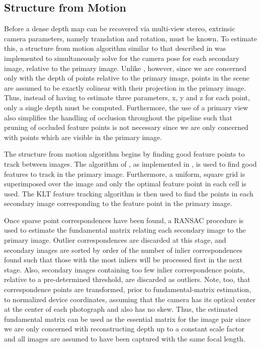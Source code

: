 \documentclass[conference]{acmsiggraph}
\begin{document}
\subsection{Structure from Motion}

Before a dense depth map can be recovered via multi-view stereo,
extrinsic camera parameters, namely translation and rotation, must be known.
To estimate this, a structure from motion algorithm similar to that
described in \cite{snavely2006photo} was implemented to
simultaneously solve for the camera pose for each secondary image,
relative to the primary image.
Unlike \cite{snavely2006photo}, however, since we are concerned
only with the depth of points relative to the primary image,
points in the scene are assumed to be exactly colinear with
their projection in the primary image.  Thus, instead of having
to estimate three parameters, x, y and z for each point,
only a single depth must be computed.  Furthermore, the use
of a primary view also simplifies the handling of occlusion throughout
the pipeline such that pruning of occluded feature points
is not necessary since we are only concerned with points which
are visible in the primary image.

The structure from motion algorithm begins by finding good feature points
to track between images.  The algorithm of \cite{shi1994good}, as implemented
in \cite{opencv_library}, is used to find good features to track in the
primary image.
Furthermore, a uniform, square grid is superimposed over the image and only
the optimal feature point in each cell is used.
The KLT feature tracking algorithm is then used to find the points in each
secondary image corresponding to the feature point in the primary image.

Once sparse point correspondences have been found, a RANSAC procedure
is used to estimate the fundamental matrix relating each secondary
image to the primary image.  Outlier correspondences are discarded at this
stage, and secondary images are sorted by order of the number of inlier
correspondences found such that those with the most inliers will
be processed first in the next stage.  Also, secondary images containing
too few inlier correspondence points, relative to a pre-determined
threshold, are discarded as outliers.  Note, too, that correspondence
points are transformed, prior to fundamental-matrix estimation, to normalized
device coordinates, assuming that the camera has its optical center at the center of each
photograph and also has no skew.  Thus, the estimated fundamental matrix
can be used as the essential matrix for the image pair since
we are only concerned with reconstructing depth up to a constant scale
factor and all images are assumed to have been captured with the
same focal length.
\end{document}
